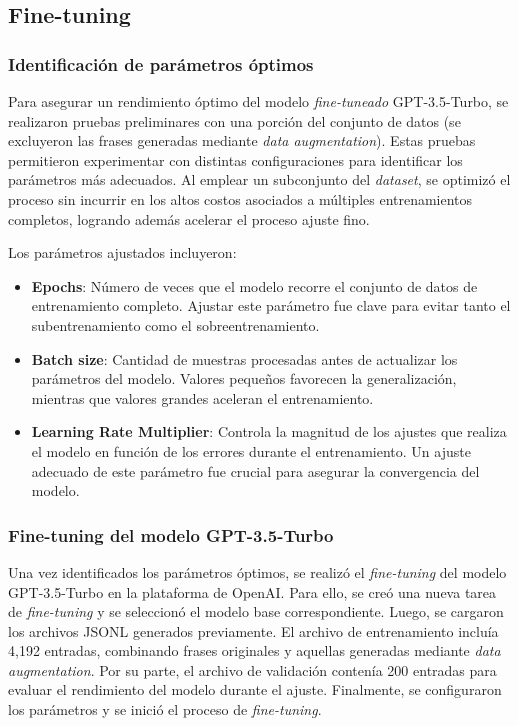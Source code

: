\subsection{Fine-tuning}


\subsubsection{Identificación de parámetros óptimos}

Para asegurar un rendimiento óptimo del modelo \textit{fine-tuneado} GPT-3.5-Turbo, se realizaron pruebas preliminares con una porción del conjunto de datos (se excluyeron las frases generadas mediante \textit{data augmentation}). Estas pruebas permitieron experimentar con distintas configuraciones para identificar los parámetros más adecuados. Al emplear un subconjunto del \textit{dataset}, se optimizó el proceso sin incurrir en los altos costos asociados a múltiples entrenamientos completos, logrando además acelerar el proceso ajuste fino.

Los parámetros ajustados incluyeron:

\begin{itemize}
    \item \textbf{Epochs}: Número de veces que el modelo recorre el conjunto de datos de entrenamiento completo. Ajustar este parámetro fue clave para evitar tanto el subentrenamiento como el sobreentrenamiento.
    
    \item \textbf{Batch size}: Cantidad de muestras procesadas antes de actualizar los parámetros del modelo. Valores pequeños favorecen la generalización, mientras que valores grandes aceleran el entrenamiento.
    
    \item \textbf{Learning Rate Multiplier}: Controla la magnitud de los ajustes que realiza el modelo en función de los errores durante el entrenamiento. Un ajuste adecuado de este parámetro fue crucial para asegurar la convergencia del modelo.
\end{itemize}


\subsubsection{Fine-tuning del modelo GPT-3.5-Turbo}

Una vez identificados los parámetros óptimos, se realizó el \textit{fine-tuning} del modelo GPT-3.5-Turbo en la plataforma de OpenAI. Para ello, se creó una nueva tarea de \textit{fine-tuning} y se seleccionó el modelo base correspondiente. Luego, se cargaron los archivos JSONL generados previamente. El archivo de entrenamiento incluía 4,192 entradas, combinando frases originales y aquellas generadas mediante \textit{data augmentation}. Por su parte, el archivo de validación contenía 200 entradas para evaluar el rendimiento del modelo durante el ajuste. Finalmente, se configuraron los parámetros y se inició el proceso de \textit{fine-tuning}.


